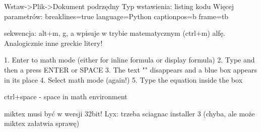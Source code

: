 




Wstaw->Plik->Dokument podrzędny
Typ wstawienia: listing kodu
Więcej parametrów:
breaklines=true %
language=Python %
captionpos=b %
frame=tb %






%
sekwencja: alt+m, g, a wpisuje w trybie matematycznym (ctrl+m) alfę. Analogicznie inne greckie litery! 

1. Enter to math mode (either for inline formula or display formula)
2. Type \mbox and then a press ENTER or SPACE
3. The text "\mbox" disappears and a blue box appears in its place
4. Select math mode (again!)
5. Type the equation inside the box 

%
ctrl+space  - space in math environment





miktex musi być w wersji 32bit! Lyx: trzeba sciagnac installer 3 (chyba, ale może miktex załatwia sprawę)

